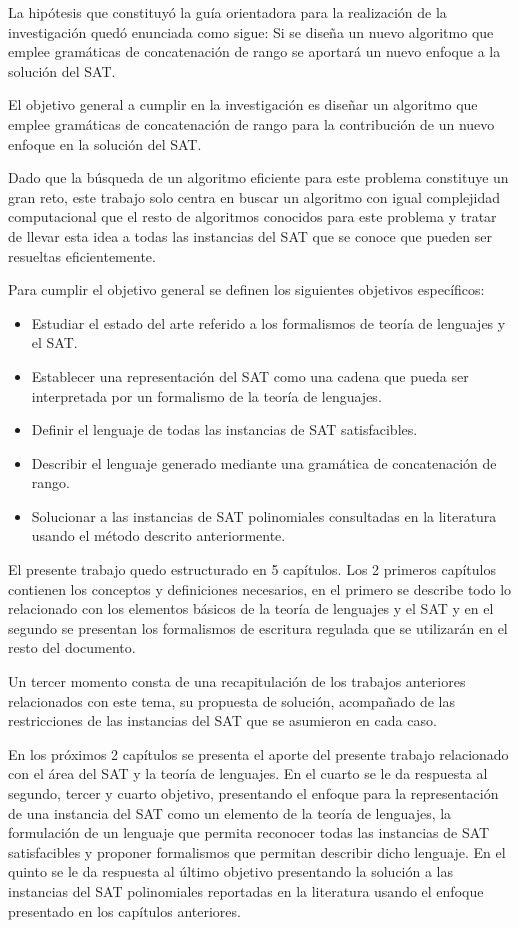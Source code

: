\documentclass[12pt]{article}
\begin{document}
La hipótesis que constituyó la guía orientadora para la realización de la investigación quedó enunciada como sigue: Si se diseña un nuevo algoritmo que emplee gramáticas de concatenación de rango se aportará un nuevo enfoque a la solución del
SAT.

El objetivo general a cumplir en la investigación es diseñar un algoritmo que emplee gramáticas de concatenación de rango para la contribución
de un nuevo enfoque en la solución del SAT.

Dado que la búsqueda
de un algoritmo eficiente para este problema constituye un gran reto, este trabajo solo centra en buscar un algoritmo con igual
complejidad computacional que el resto de algoritmos conocidos para este problema y tratar de llevar esta idea a todas las instancias
del SAT que se conoce que pueden ser resueltas eficientemente.

Para cumplir el objetivo general se definen los siguientes objetivos específicos:

\begin{itemize}
      \item Estudiar el estado del arte referido a los formalismos de teoría de lenguajes y el SAT.
      \item Establecer una representación del SAT como una cadena que pueda ser interpretada por un formalismo de la teoría de lenguajes.
      \item Definir el lenguaje de todas las instancias de SAT satisfacibles.
      \item Describir el lenguaje generado mediante una gramática de concatenación de rango.
      \item Solucionar a las instancias de SAT polinomiales consultadas en la literatura usando el método descrito anteriormente.
\end{itemize}

El presente trabajo quedo estructurado en 5 capítulos. Los 2 primeros capítulos contienen los conceptos y definiciones
necesarios, en el primero se describe todo lo relacionado con los elementos básicos
de la teoría de lenguajes y el SAT y en el segundo se presentan los formalismos de escritura regulada que se utilizarán en el resto
del documento.

Un tercer momento consta de una recapitulación de los trabajos anteriores relacionados con este tema, su propuesta
de solución, acompañado de las restricciones de las instancias del SAT que se asumieron en cada caso.

En los próximos 2 capítulos se presenta el aporte del presente trabajo relacionado con el área del SAT y la teoría de lenguajes.
En el cuarto se le da respuesta al segundo, tercer y cuarto objetivo, presentando el enfoque para la representación de una instancia
del SAT como un elemento de la teoría de lenguajes, la formulación de un lenguaje que permita reconocer todas las instancias
de SAT satisfacibles y proponer formalismos que permitan describir dicho lenguaje.
En el quinto se le da respuesta al último objetivo presentando la solución a las instancias del SAT polinomiales reportadas en la literatura
usando el enfoque presentado en los capítulos anteriores.
\end{document}
